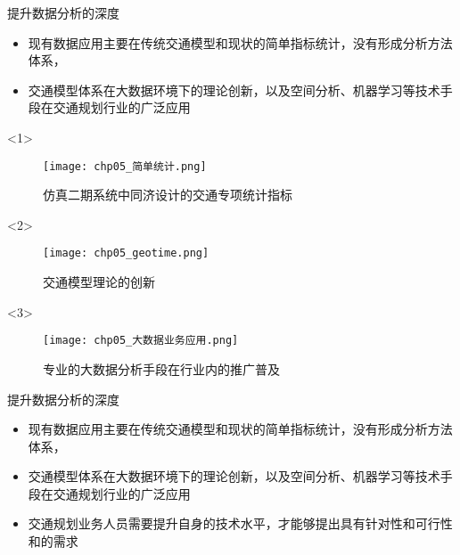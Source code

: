 \begin{frame}[t]{提升数据分析的深度}
\begin{itemize}
\item<1-> 现有数据应用主要在传统交通模型和现状的简单指标统计，没有形成分析方法体系，
\item<2-> 交通模型体系在大数据环境下的理论创新，以及空间分析、机器学习等技术手段在交通规划行业的广泛应用
\end{itemize}

\begin{overlayarea}{\textwidth}{\textheight}
  \begin{onlyenv}<1>
\begin{figure}
  \centering
  \texttt{[image: chp05\_简单统计.png]}
  \caption{仿真二期系统中同济设计的交通专项统计指标}
\end{figure}
  \end{onlyenv}

\vspace{-15pt}
  \begin{onlyenv}<2>
\begin{figure}
  \centering
  \texttt{[image: chp05\_geotime.png]}
  \caption{交通模型理论的创新}
\end{figure}
  \end{onlyenv}

  \begin{onlyenv}<3>
\begin{figure}
  \centering
  \texttt{[image: chp05\_大数据业务应用.png]}
  \caption{专业的大数据分析手段在行业内的推广普及}
\end{figure}
  \end{onlyenv}
\end{overlayarea}
\end{frame}

\begin{frame}[t]{提升数据分析的深度}
\begin{itemize}
\item 现有数据应用主要在传统交通模型和现状的简单指标统计，没有形成分析方法体系，
\item 交通模型体系在大数据环境下的理论创新，以及空间分析、机器学习等技术手段在交通规划行业的广泛应用
\item<2-> 交通规划业务人员需要提升自身的技术水平，才能够提出具有针对性和可行性和的需求
\end{itemize}
\end{frame}

